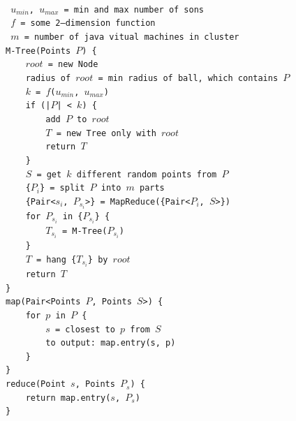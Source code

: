 \documentclass{article}
\begin{document}
        {\tt
            \phantom ~~ \\
            \phantom ~$u_{min}$, $u_{max}$ = min and max number of sons    \\
            \phantom ~$f$ = some 2--dimension function    \\
            \phantom ~$m$ = number of java vitual machines in cluster    \\
            
            \noindent M-Tree(Points $P$) \{ \\
            \phantom ~~~~$root$ = new Node    \\
            \phantom ~~~~radius of $root$ = min radius of ball, which contains $P$    \\
            \phantom ~~~~$k$ = $f$($u_{min}$, $u_{max}$)    \\
            \phantom ~~~~if (|$P$| < $k$) \{    \\
            \phantom ~~~~~~~~add $P$ to $root$    \\
            \phantom ~~~~~~~~$T$ = new Tree only with $root$    \\
            \phantom ~~~~~~~~return $T$    \\
            \phantom ~~~~\}    \\            
            \phantom ~~~~$S$ = get $k$ different random points from $P$      \\
            \phantom ~~~~\{$P_i$\} = split $P$ into $m$ parts    \\
            \phantom ~~~~\{Pair<$s_i$, $P_{s_i}$>\} = MapReduce(\{Pair<$P_i$, $S$>\})    \\  
            \phantom ~~~~for $P_{s_i}$ in \{$P_{s_i}$\} \{   \\ 
            \phantom ~~~~~~~~$T_{s_i}$ = M-Tree($P_{s_i}$)    \\
            \phantom ~~~~\}    \\
            \phantom ~~~~$T$ = hang \{$T_{s_i}$\} by $root$    \\
            \phantom ~~~~return $T$    \\ 
                     \}    \\
            
            \noindent map(Pair<Points $P$, Points $S$>) \{    \\
            \phantom ~~~~for $p$ in $P$ \{    \\
            \phantom ~~~~~~~~$s$ = closest to $p$ from $S$    \\
            \phantom ~~~~~~~~to output: map.entry(s, p)    \\  
            \phantom ~~~~\}    \\   
                     \}    \\
                     
            \noindent reduce(Point $s$, Points $P_s$) \{    \\
            \phantom ~~~~return map.entry($s$, $P_s$)    \\         
                     \}
        }
        
\end{document}
